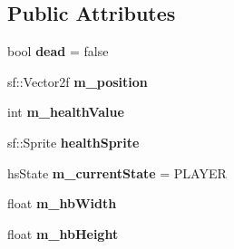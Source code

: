 \subsection*{Public Attributes}
\begin{DoxyCompactItemize}
\item 
\mbox{\label{class_health_system_a3aee22fae436dc4966caf0726dcbe9bb}} 
bool {\bfseries dead} = false
\item 
\mbox{\label{class_health_system_a79423a4c710bc6bec6876e673d780fc5}} 
sf\+::\+Vector2f {\bfseries m\+\_\+position}
\item 
\mbox{\label{class_health_system_af5efc6a207dcc25be3c1d89cdbee4d5f}} 
int {\bfseries m\+\_\+health\+Value}
\item 
\mbox{\label{class_health_system_a3c401e0104c299b34ccf198b1045ffa7}} 
sf\+::\+Sprite {\bfseries health\+Sprite}
\item 
\mbox{\label{class_health_system_a56f0a0b1991da5b5c3a4cfd90f1fdf2f}} 
hs\+State {\bfseries m\+\_\+current\+State} = P\+L\+A\+Y\+ER
\item 
\mbox{\label{class_health_system_a199a775106497e622f97b5e0e6bb1034}} 
float {\bfseries m\+\_\+hb\+Width}
\item 
\mbox{\label{class_health_system_a8fd8c5d1b85b0abab2b3c18d9dbc0520}} 
float {\bfseries m\+\_\+hb\+Height}
\end{DoxyCompactItemize}
